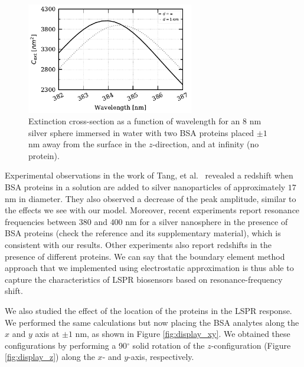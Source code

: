 \begin{figure}[h] %
    \centering
    \includegraphics[width=0.65\textwidth]{2pz_R8nm.pdf} 
    \caption{Extinction cross-section as a function of wavelength for an $8$ nm
             silver sphere immersed in water with two BSA proteins placed 
             $\pm 1$ nm away from the surface in the $z$-direction, and at
             infinity (no protein).}
    \label{fig:2pz_response}
 \end{figure}

Experimental observations in the work of Tang, et al.~\cite{TangETal2010} revealed a redshift when 
BSA proteins in a solution are added to silver nanoparticles of approximately $17$ nm 
in diameter. They also observed a decrease of the peak amplitude, similar to the 
effects we see with our model. Moreover, recent experiments \cite{PuETal2018} report 
resonance frequencies between $380$ and $400$ nm for a silver nanosphere in the presence
of BSA proteins (check the reference and its supplementary material), which is consistent with 
our results. Other experiments \cite{RaphaelETal2013} also report redshifts in the presence
of different proteins. We can say that the boundary element method approach that we implemented using 
electrostatic approximation is thus able to capture the characteristics of LSPR biosensors
based on resonance-frequency shift. 

We also studied the effect of the location of the proteins in the LSPR response. We performed 
the same calculations but now placing the BSA analytes along the $x$ and $y$ axis at $\pm 1$ nm,
as shown in Figure \ref{fig:display_xy}. We obtained these configurations by performing
a 90$^\circ$ solid rotation of the $z$-configuration (Figure \ref{fig:display_z}) along the $x$- and $y$-axis, respectively. 

